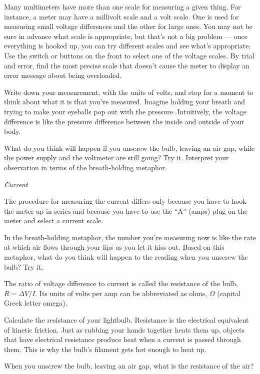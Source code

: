 Many multimeters have more than one scale for
measuring a given thing. For instance, a meter may have a
millivolt scale and a volt scale. One is used for measuring
small voltage differences and the other for large ones. You may not
be sure in advance what scale is appropriate, but that's not
a big problem --- once everything is hooked up, you can try
different scales and see what's appropriate. Use the switch
or buttons on the front to select one of the voltage scales.
By trial and error, find the most precise scale that doesn't
cause the meter to display an error message about being overloaded.

Write down your measurement, with the units of volts, and stop
for a moment to think about what it is that you've measured.
Imagine holding your breath and trying to make your eyeballs
pop out with the pressure. 
Intuitively, the voltage difference is like the pressure difference
between the inside and outside of your body.

What do you think will happen if you unscrew the bulb, leaving
an air gap, while the
power supply and the voltmeter are still going? Try it.
Interpret your observation in terms of the breath-holding
metaphor.

\emph{Current}

The procedure for measuring the current differs only because
you have to hook the meter up in series and because you have
to use the ``A'' (amps) plug on the meter and select a current
scale.

In the breath-holding metaphor, the number you're measuring
now is like the rate at which air flows 
through your lips as you let it hiss out. Based on this
metaphor, what do you think will happen to the reading when
you unscrew the bulb? Try it.


The ratio of voltage difference to current is called the resistance
of the bulb, $R=\Delta V/I$. Its units of volts per amp can be
abbreviated as ohms, $\Omega$ (capital Greek letter omega).

Calculate the resistance of your lightbulb. Resistance is the
electrical equivalent of kinetic friction. Just as rubbing
your hands together heats them up, objects that have
electrical resistance produce heat when a current is passed
through them. This is why the bulb's filament gets hot enough
to heat up.

When you unscrew the bulb, leaving an air gap, what is the
resistance of the air?


